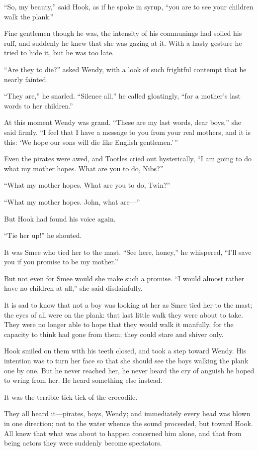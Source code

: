 ``So, my beauty,'' said Hook, as if he spoke in syrup, ``you are to see
your children walk the plank.''

Fine gentlemen though he was, the intensity of his communings had
soiled his ruff, and suddenly he knew that she was gazing at it. With a
hasty gesture he tried to hide it, but he was too late.

``Are they to die?'' asked Wendy, with a look of such frightful contempt
that he nearly fainted.

``They are,'' he snarled. ``Silence all,'' he called gloatingly, ``for a
mother's last words to her children.''

At this moment Wendy was grand. ``These are my last words, dear boys,''
she said firmly. ``I feel that I have a message to you from your real
mothers, and it is this: ‘We hope our sons will die like English
gentlemen.'\,''

Even the pirates were awed, and Tootles cried out hysterically, ``I am
going to do what my mother hopes. What are you to do, Nibs?''

``What my mother hopes. What are you to do, Twin?''

``What my mother hopes. John, what are---''

But Hook had found his voice again.

``Tie her up!'' he shouted.

It was Smee who tied her to the mast. ``See here, honey,'' he whispered,
``I'll save you if you promise to be my mother.''

But not even for Smee would she make such a promise. ``I would almost
rather have no children at all,'' she said disdainfully.

It is sad to know that not a boy was looking at her as Smee tied her to
the mast; the eyes of all were on the plank: that last little walk they
were about to take. They were no longer able to hope that they would
walk it manfully, for the capacity to think had gone from them; they
could stare and shiver only.

Hook smiled on them with his teeth closed, and took a step toward
Wendy. His intention was to turn her face so that she should see the
boys walking the plank one by one. But he never reached her, he never
heard the cry of anguish he hoped to wring from her. He heard something
else instead.

It was the terrible tick-tick of the crocodile.

They all heard it---pirates, boys, Wendy; and immediately every head was
blown in one direction; not to the water whence the sound proceeded,
but toward Hook. All knew that what was about to happen concerned him
alone, and that from being actors they were suddenly become spectators.

